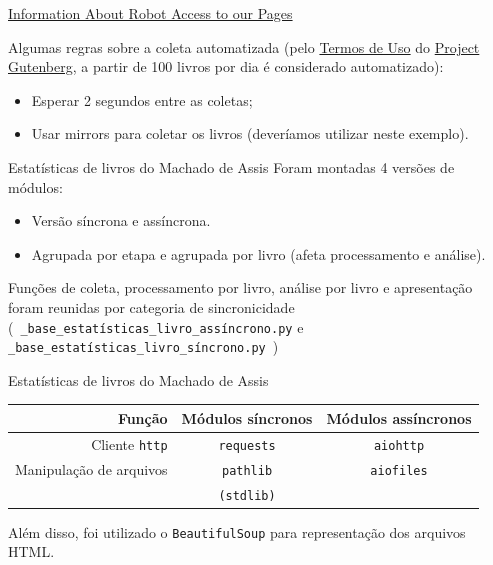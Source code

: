 \documentclass[12pt]{beamer}
\begin{document}
\begin{frame}[fragile]{\href{http://www.gutenberg.org/wiki/Gutenberg:Information\_About\_Robot\_Access\_to\_our\_Pages}{Information About Robot Access to our Pages}}

  Algumas regras sobre a coleta automatizada (pelo \href{http://www.gutenberg.org/wiki/Gutenberg:Terms\_of\_Use}{Termos de Uso} do \href{http://www.gutenberg.org/}{Project Gutenberg}, a partir de 100 livros por dia é considerado automatizado):

  \begin{itemize}
    \item Esperar 2 segundos entre as coletas;

    \item Usar mirrors para coletar os livros (deveríamos utilizar neste exemplo).
  \end{itemize}
\end{frame}

\begin{frame}[fragile]{Estatísticas de livros do Machado de Assis}
  Foram montadas 4 versões de módulos:

  \begin{itemize}
    \item Versão síncrona e assíncrona.
    \item Agrupada por etapa e agrupada por livro (afeta processamento e análise).
  \end{itemize}

  Funções de coleta, processamento por livro, análise por livro e apresentação foram reunidas por categoria de sincronicidade (\ \texttt{\_base\_estatísticas\_livro\_assíncrono.py} e \texttt{\_base\_estatísticas\_livro\_síncrono.py}\ )
\end{frame}

\begin{frame}[fragile]{Estatísticas de livros do Machado de Assis}
  \scriptsize{
  \begin{table}
    \vspace{-0.5cm}
    \begin{tabular}{@{} rcc @{}}
      \toprule
      Função & Módulos síncronos & Módulos assíncronos\\
      \midrule
      Cliente \texttt{http} & \texttt{requests} & \texttt{aiohttp}\\
      \midrule
      Manipulação de arquivos & \texttt{pathlib} & \texttt{aiofiles}\\
                              & \texttt{(stdlib)} & \\
      \bottomrule
    \end{tabular}
  \end{table}}

  Além disso, foi utilizado o \texttt{BeautifulSoup} para representação dos arquivos HTML.
\end{frame}
\end{document}
